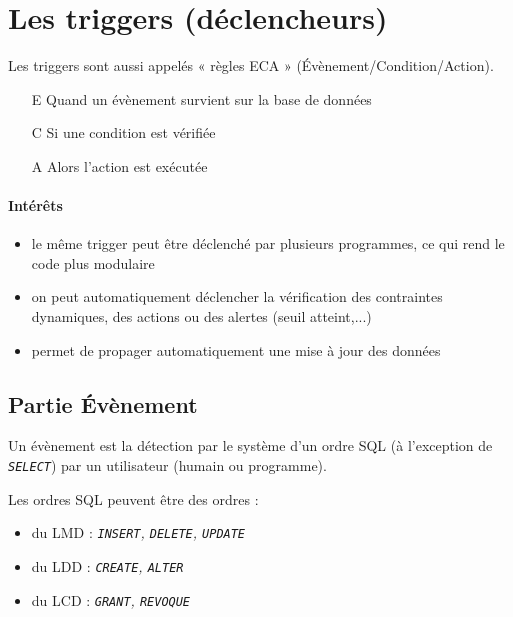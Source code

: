 \documentclass[10pt]{article}
\begin{document}
    \section{Les triggers (déclencheurs)}
        Les triggers sont aussi appelés « règles ECA » (Évènement/Condition/Action).
        \begin{itemize}
            \item[E] Quand un évènement survient sur la base de données
            \item[C] Si une condition est vérifiée
            \item[A] Alors l'action est exécutée
        \end{itemize}

        \paragraph{Intérêts}
            \begin{itemize}
                \item le même trigger peut être déclenché par plusieurs programmes, ce qui rend le code plus modulaire
                \item on peut automatiquement déclencher la vérification des contraintes dynamiques, des actions ou des alertes (seuil atteint,...)
                \item permet de propager automatiquement une mise à jour des données
            \end{itemize}

        \subsection{Partie Évènement}
            Un évènement est la détection par le système d'un ordre SQL (à l'exception de \emph{\texttt{SELECT}}) par un utilisateur (humain ou programme).

            Les ordres SQL peuvent être des ordres :
                \begin{itemize}
                    \item du LMD : \emph{\texttt{INSERT}, \texttt{DELETE}, \texttt{UPDATE}}
                    \item du LDD : \emph{\texttt{CREATE}, \texttt{ALTER}}
                    \item du LCD : \emph{\texttt{GRANT}, \texttt{REVOQUE}}
                \end{itemize}
\end{document}
